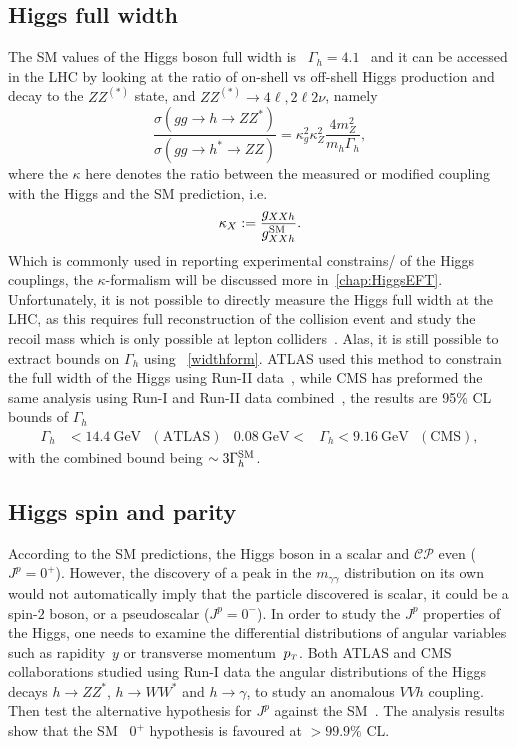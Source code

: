 \subsection{Higgs full width}
The SM values of the Higgs boson full width is ~$\Gamma_h=4.1$ \GeV\, and it can be accessed in the LHC by looking at the ratio of on-shell vs off-shell Higgs production and decay to the $ZZ^{(*)}$ state, and $ZZ^{(*)}\to 4 \ell, 2 \ell 2 \nu$, namely
\begin{equation}
\frac{\sigma(gg \to h\to Z Z^*)}{\sigma(gg \to h^*\to Z Z)} = \kappa_g^2 \kappa_Z^2 \frac{4 m_Z^2}{m_h \Gamma_h},
\label{widthform}
\end{equation}
where the $\kappa$ here denotes the ratio between the measured or modified coupling with the Higgs and the SM prediction, i.e.
\begin{equation}
\kappa_X := \frac{g_{XX h}}{g_{XXh}^{\mathrm{SM}}}.
\label{kappa}
\end{equation}
Which is commonly used in reporting experimental constrains/ of the Higgs couplings,  the $\kappa$-formalism will be discussed more in~\autoref{chap:HiggsEFT}. \\  Unfortunately, it is not possible to directly measure the Higgs full width at the LHC, as this requires full reconstruction of the collision event and study the recoil mass which is only possible at lepton colliders~\cite{DeBlas:2019qco,Banerjee:2021huv}. 
Alas, it is still possible to extract bounds on $\Gamma_h$ using ~\eqref{widthform}. ATLAS used this method to constrain the full width of the Higgs using Run-II data~\cite{ATLAS:2018jym}, while CMS has preformed the same analysis using Run-I and Run-II data combined~\cite{CMS:2019ekd}, the results are 95\% CL bounds of $\Gamma_h$
\begin{align}
\Gamma_h &< \SI{14.4}{\giga\electronvolt} \,\,\,\, (\text{ATLAS}) & \SI{0.08}{\giga\electronvolt} <&\Gamma_h < \SI{9.16}{\giga\electronvolt}  \,\,\,\, (\text{CMS}),
\end{align}
with the combined bound being  $\sim 3 \Gamma_h^{\mathrm{SM}}$. 
\subsection{Higgs spin and parity \label{higgscp}}
According to the SM predictions, the Higgs boson in a scalar and $\mathcal{CP}$ even ($J^p= 0^+$). However, the discovery of  a peak in the $m_{\gamma \gamma}$ distribution on its own would not automatically imply that the particle discovered is scalar, it could be a spin-$2$ boson, or a pseudoscalar  ($J^p= 0^-$). In order to study the $J^p$ properties of the Higgs, one needs to examine the differential distributions of angular variables such as rapidity~$y$ or transverse momentum~$p_{\scriptscriptstyle T}$. Both ATLAS and CMS collaborations studied using Run-I data the angular distributions of the Higgs decays $ h \to ZZ^*$, $h \to W W^*$ and $ h \to \gamma$, to study an anomalous $VVh$ coupling. Then test the alternative hypothesis for $J^p$ against the SM~\cite{ATLAS:2015zhl,CMS:2014nkk}.  The analysis results show that the SM ~$0^+$ hypothesis is favoured at $ >99.9\%$ CL. 

